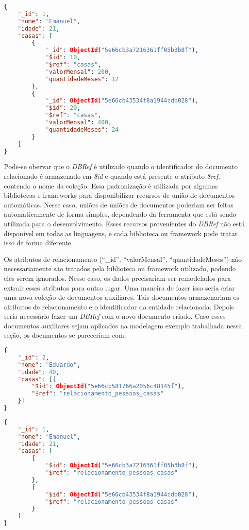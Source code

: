 \newpage

\begin{lstlisting}[language=json, caption={Documento da Pessoa \textit{Emanuel}}]
{
    "_id": 1,
    "nome": "Emanuel",
    "idade": 21,
    "casas": [
        {
            "_id": ObjectId("5e66cb3a7216361ff05b3b8f"),
            "$id": 10,
            "$ref": "casas",
            "valorMensal": 200,
            "quantidadeMeses": 12
        },
        {
            "_id": ObjectId("5e66cb43534f8a1944cdb028"),
            "$id": 20,
            "$ref": "casas",
            "valorMensal": 400,
            "quantidadeMeses": 24
        }
    ]
}
\end{lstlisting}

Pode-se obervar que o \textit{DBRef} é utilizado quando o identificador do documento relacionado é armazenado em \textit{\$id} e quando está presente o atributo \textit{\$ref}, contendo o nome da coleção. Essa padronização é utilizada por algumas bibliotecas e frameworks para disponibilizar recursos de união de documentos automáticas. Nesse caso, uniões de uniões de documentos poderiam ser feitas automaticamente de forma simples, dependendo da ferramenta que está sendo utilizada para o desenvolvimento. Esses recursos provenientes do \textit{DBRef} não está disponível em todas as linguagens, e cada biblioteca ou framework pode tratar isso de forma diferente.

Os atributos de relacionamento (``\_id'', ``valorMensal'', ``quantidadeMeses'') não necessariamente são tratados pela biblioteca ou framework utilizado, podendo eles serem ignorados. Nesse caso, os dados precisariam ser remodelados para extrair esses atributos para outro lugar. Uma maneira de fazer isso seria criar uma nova coleção de documentos auxiliares. Tais documentos armazenariam os atributos de relacionamento e o identificador da entidade relacionada. Depois seria necessário fazer um \textit{DBRef} com o novo documento criado. Caso esses documentos auxiliares sejam aplicados na modelagem exemplo trabalhada nessa seção, os documentos se pareceriam com:

\begin{lstlisting}[language=json, caption={Documento da Pessoa \textit{Eduardo}}]
{
    "_id": 2,
    "nome": "Eduardo",
    "idade": 40,
    "casas": [{
        "$id": ObjectId("5e66cb581766a2056c48145f"),
        "$ref": "relacionamento_pessoas_casas"
    }]
}
\end{lstlisting}

\begin{lstlisting}[language=json, caption={Documento da Pessoa \textit{Emanuel}}]
{
    "_id": 1,
    "nome": "Emanuel",
    "idade": 21,
    "casas": [
        {
            "$id": ObjectId("5e66cb3a7216361ff05b3b8f"),
            "$ref": "relacionamento_pessoas_casas"
        },
        {
            "$id": ObjectId("5e66cb43534f8a1944cdb028"),
            "$ref": "relacionamento_pessoas_casas"
        }
    ]
}
\end{lstlisting}

